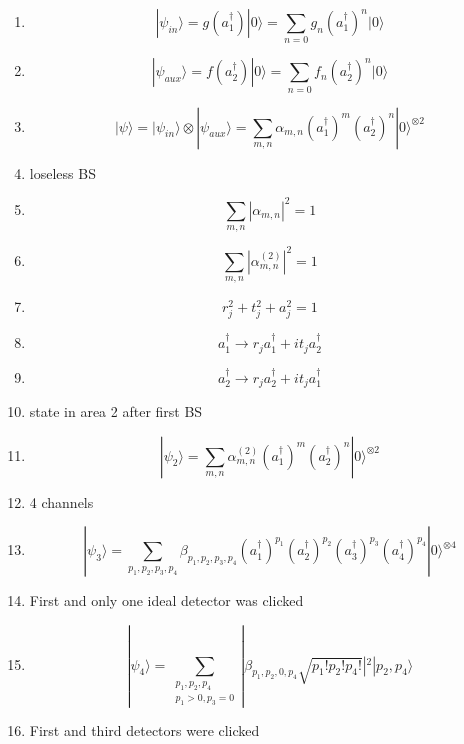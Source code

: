 \documentclass[12pt]{article}
\begin{document}
\begin{enumerate}
\item $$  |\psi_{in}\rangle = g(a_{1}^{\dag})|0\rangle  = \sum_{n=0} g_{n} (a_{1}^{\dag})^{n} |0\rangle  $$
\item $$  |\psi_{aux}\rangle = f(a_{2}^{\dag})|0\rangle  = \sum_{n=0} f_{n} (a_{2}^{\dag})^{n} |0\rangle  $$

\item $$ |\psi\rangle = |\psi_{in}\rangle   \otimes   |\psi_{aux}\rangle = \sum_{m,n} \alpha_{m,n} (a_{1}^{\dag})^{m} (a_{2}^{\dag})^{n} |0\rangle^{\otimes 2}  $$

\item loseless BS

\item $$ \sum_{m,n} |\alpha_{m,n}|^2 = 1 $$

\item $$ \sum_{m,n} |\alpha_{m,n}^{(2)}|^2 = 1 $$

\item $$ r_{j}^2 + t_{j}^2 + a_{j}^2 = 1 $$

\item $$  a_{1}^{\dag} \rightarrow  r_{j}a_{1}^{\dag} + it_{j}a_{2}^{\dag} $$

\item $$  a_{2}^{\dag} \rightarrow  r_{j}a_{2}^{\dag} + it_{j}a_{1}^{\dag} $$

\item state in area 2 after first BS

\item $$ |\psi_{2}\rangle = \sum_{m,n} \alpha_{m,n}^{(2)} (a_{1}^{\dag})^{m} (a_{2}^{\dag})^{n} |0\rangle^{\otimes 2}  $$

\item 4 channels

\item $$ |\psi_3\rangle = \sum_{p_{1},p_{2},p_{3},p_{4}} \beta_{p_{1},p_{2},p_{3},p_{4}} (a_{1}^{\dag})^{p_{1}} (a_{2}^{\dag})^{p_{2}} (a_{3}^{\dag})^{p_{3}} (a_{4}^{\dag})^{p_{4}} |0\rangle^{\otimes 4}  $$


\item First and only one ideal detector was clicked

\item $$ |\psi_4\rangle = \sum_{\substack{p_{1},p_{2},p_{4} \\ p_{1} > 0, p_{3}=0}} |\beta_{p_{1},p_{2},0,p_{4}} \sqrt{p_{1}!p_{2}!p_{4}!}|^2 |p_{2}, p_{4}\rangle $$

\item First and third detectors were clicked


\end{enumerate}
\end{document}
